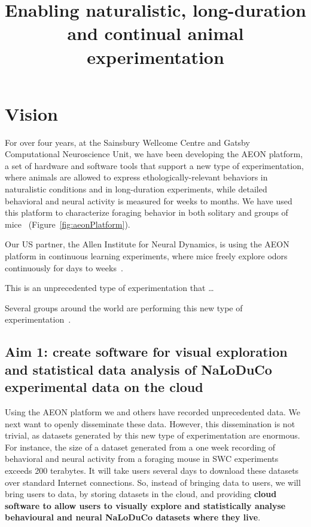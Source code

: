 \documentclass[12pt]{article}
\title{Enabling naturalistic, long-duration and continual animal experimentation}
\begin{document}
\maketitle

\section{Vision}

For over four years, at the Sainsbury Wellcome Centre and Gatsby Computational
Neuroscience Unit, we have been developing the AEON platform, a set of hardware
and software tools that support a new type of experimentation, where animals
are allowed to express ethologically-relevant behaviors in naturalistic
conditions and in long-duration experiments, while detailed behavioral and
neural activity is measured for weeks to months.
%
We have used this platform to characterize foraging behavior in both solitary
and groups of mice~\citep{aeonRepo} (Figure~\ref{fig:aeonPlatform}).

Our US partner, the Allen Institute for Neural Dynamics, is using the AEON
platform in continuous learning experiments, where mice freely explore odors
continuously for days to weeks~\citep{carlsPapers}.

This is an unprecedented type of experimentation that \ldots

Several groups around the world are performing this new type of
experimentation~\cite{}.

\subsection{Aim 1: create software for visual exploration and statistical data
analysis of NaLoDuCo experimental data on the cloud}

Using the AEON platform we and others have recorded unprecedented data. We next
want to openly disseminate these data. However, this dissemination is not
trivial, as datasets generated by this new type of experimentation are
enormous. For instance, the size of a dataset generated from a one week
recording of behavioral and neural activity from a foraging mouse in SWC
experiments exceeds 200 terabytes. It will take users several days to download
these datasets over standard Internet connections.
%
So, instead of bringing data to users, we will bring users to data, by storing
datasets in the cloud, and providing \textbf{cloud software to allow users to visually
explore and statistically analyse behavioural and neural NaLoDuCo datasets
where they live}.
\end{document}
